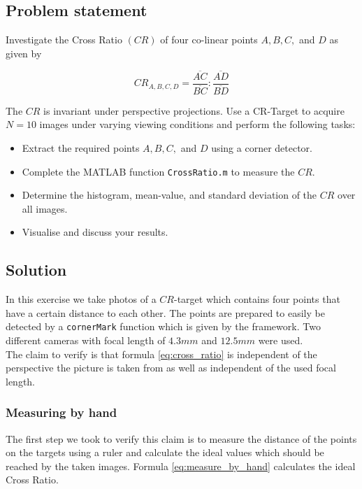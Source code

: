 \documentclass[
a4paper,     %
12pt         %
]{scrartcl}  %
\begin{document}
\subsection{Problem statement}

Investigate the Cross Ratio $(CR)$ of four co-linear points $A, B, C,$ and $D$ as given by

\begin{equation}
 CR_{A,B,C,D} = \frac{\overline{AC}}{\overline{BC}} : \frac{\overline{AD}}{\overline{BD}}
 \label{eq:cross_ratio}
\end{equation}

The $CR$ is invariant under perspective projections. Use a CR-Target to acquire $N = 10$ images under varying
viewing conditions and perform the following tasks:

\begin{itemize}
 \item Extract the required points $A, B, C,$ and $D$ using a corner detector.
 \item Complete the MATLAB function \texttt{CrossRatio.m} to measure the $CR$.
 \item Determine the histogram, mean-value, and standard deviation of the $CR$ over all images.
 \item Visualise and discuss your results.
\end{itemize}


\subsection{Solution}

In this exercise we take photos of a $CR$-target which contains four points that have a certain distance to each other.
The points are prepared to easily be detected by a \lstinline{cornerMark} function which is given by the framework.
Two different cameras with focal length of $4.3mm$ and $12.5mm$ were used.
\\
The claim to verify is that formula \ref{eq:cross_ratio} is independent of the perspective the picture is taken from as well as independent of the used focal length.

\subsubsection{Measuring by hand}

The first step we took to verify this claim is to measure the distance of the points on the targets using a ruler and calculate the ideal values which should be reached by the taken images.
Formula \ref{eq:measure_by_hand} calculates the ideal Cross Ratio.
\end{document}
